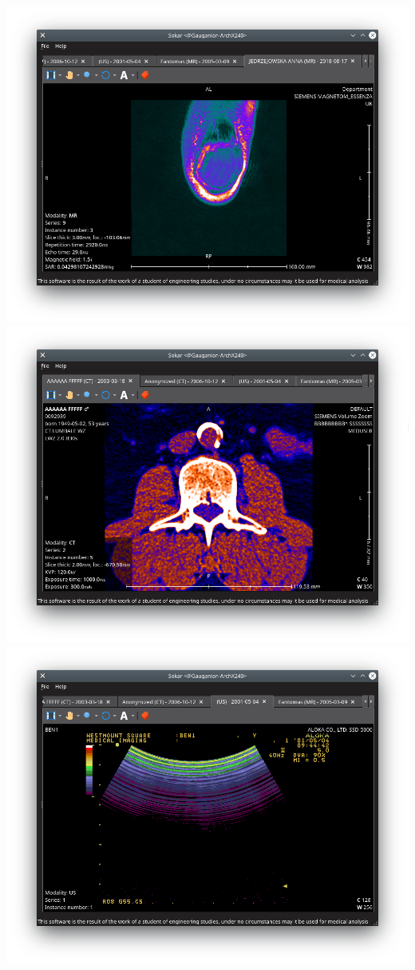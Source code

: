 \documentclass[aspectratio=169]{beamer}
\begin{document}
\begin{frame}
    \begin{columns}
        \includegraphics[width=\textwidth]{img/end1.png}
        \includegraphics[width=\textwidth]{img/end2.png}
        \includegraphics[width=\textwidth]{img/end4.png}

\end{columns}
\end{frame}
\end{document}
